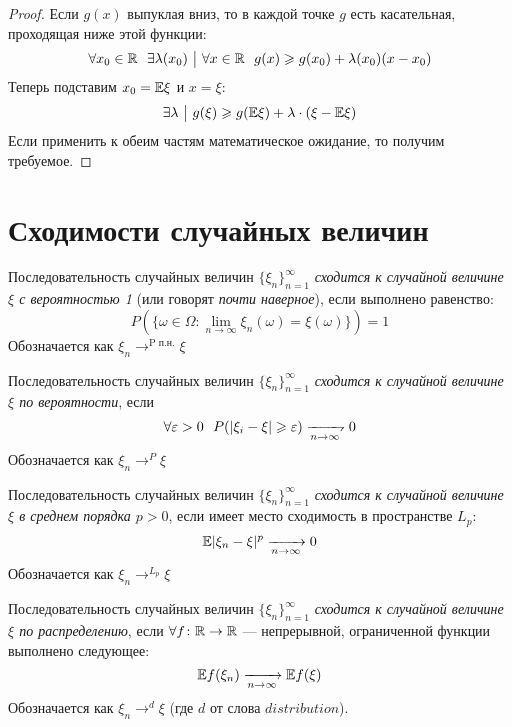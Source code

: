 \begin{proof}
	Если $g(x)$ выпуклая вниз, то в каждой точке $g$ есть касательная, проходящая ниже этой функции:
	\[
		\forall x_0 \in \mathbb{R}\ \ \exists \lambda(x_0) \ \big|\  \forall x \in \mathbb{R}\ \ g(x) \geqslant g(x_0) + \lambda(x_0)(x - x_0)
	\]
	Теперь подставим $x_0 = \mathbb{E}\xi$ и $x = \xi$:
	\[
		\exists \lambda \ \big|\  g(\xi) \geqslant g(\mathbb{E}\xi) + \lambda \cdot (\xi - \mathbb{E}\xi)
	\]
	Если применить к обеим частям математическое ожидание, то получим требуемое.
\end{proof}

\section{Сходимости случайных величин}

\begin{definition}
	Последовательность случайных величин $\{\xi_n\}_{n = 1}^\infty$ \textit{сходится к случайной величине $\xi$ с вероятностью 1} (или говорят \textit{почти наверное}), если выполнено равенство:
	\[
		P(\{\omega \in \Omega \colon \lim_{n \to \infty} \xi_n(\omega) = \xi(\omega)\}) = 1
	\]
	Обозначается как $\xi_n \to^{\text{P п.н.}} \xi$
\end{definition}

\begin{definition}
	Последовательность случайных величин $\{\xi_n\}_{n = 1}^\infty$ \textit{сходится к случайной величине $\xi$ по вероятности}, если
	\[
		\forall \eps > 0\ \ P(|\xi_i - \xi| \ge \eps) \xrightharpoondown[n \to \infty]{} 0
	\]
	Обозначается как $\xi_n \to^P \xi$
\end{definition}

\begin{definition}
	Последовательность случайных величин $\{\xi_n\}_{n = 1}^\infty$ \textit{сходится к случайной величине $\xi$ в среднем порядка $p > 0$}, если имеет место сходимость в пространстве $L_p$:
	\[
		\mathbb{E}|\xi_n - \xi|^p \xrightarrow[n \to \infty]{} 0
	\]
	Обозначается как $\xi_n \to^{L_p} \xi$
\end{definition}

\begin{definition}
	Последовательность случайных величин $\{\xi_n\}_{n = 1}^\infty$ \textit{сходится к случайной величине $\xi$ по распределению}, если $\forall f \colon \mathbb{R} \to \mathbb{R}$ --- непрерывной, ограниченной функции выполнено следующее:
	\[
		\mathbb{E} f(\xi_n) \xrightarrow[n \to \infty]{
		} \mathbb{E} f(\xi)
	\]
	Обозначается как $\xi_n \to^d \xi$ (где $d$ от слова $distribution$).
\end{definition}

